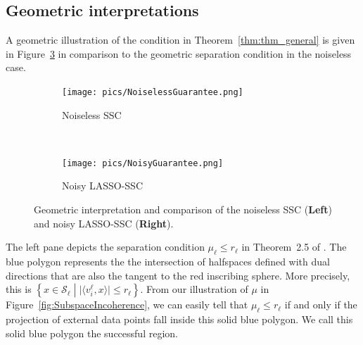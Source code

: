 \documentclass[twoside,11pt]{article}
\numberwithin{equation}{section}
\def\cS{\mathcal{S}}
\begin{document}
\subsection{Geometric interpretations}%
A geometric illustration of the condition in Theorem~\ref{thm:thm_general} is given in Figure~\ref{fig:geom_interpretation} in comparison to the geometric separation condition in the noiseless case.

\begin{figure}
        \centering
        \begin{subfigure}[t]{0.4\textwidth}
          \centering
              \texttt{[image: pics/NoiselessGuarantee.png]}\\
               \caption{Noiseless SSC}
               \label{fig.noiseless_guarantee}
        \end{subfigure}%
        ~ %
        \begin{subfigure}[t]{0.4\textwidth}
              \centering
              \texttt{[image: pics/NoisyGuarantee.png]}\\
              \caption{Noisy LASSO-SSC} \label{fig.noisy_guarantee}
        \end{subfigure}
   \caption{Geometric interpretation and comparison of the noiseless SSC (\textbf{Left}) and noisy LASSO-SSC (\textbf{Right}).
   }
   \label{fig:geom_interpretation}
\end{figure}

The left pane depicts the separation condition $\mu_\ell \leq r_\ell$ in Theorem~2.5 of \citet{soltanolkotabi2011geometric}. The blue polygon represents the the intersection of halfspaces defined with dual directions that are also the tangent to the red inscribing sphere. More precisely, this is $\left\{x\in \cS_\ell \middle| \big|\langle v_i^{\ell}, x\rangle\big| \leq r_\ell\right\}$. From our illustration of $\mu$ in Figure~\ref{fig:SubspaceIncoherence}, we can easily tell that $\mu_\ell\leq r_\ell$ if and only if the projection of external data points fall inside this solid blue polygon. We call this solid blue polygon the successful region.
\end{document}
